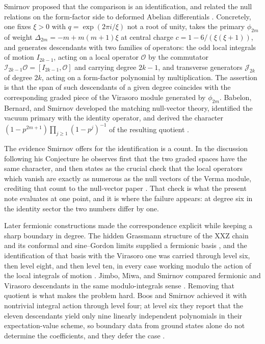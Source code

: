 \documentclass[11pt,reqno]{amsart}
\theoremstyle{plain}
\theoremstyle{definition}
\theoremstyle{remark}
\numberwithin{equation}{section}
\newcommand{\Iop}{\mathcal I}
\newcommand{\Jop}{\mathcal J}
\begin{document}
Smirnov proposed that the comparison is an identification, and related the
null relations on the form-factor side to deformed Abelian differentials
\cite{Smirnov_1996ot,Smirnov_1998so}. Concretely, one fixes $\xi>0$ with
$q=\exp(2\pi i/\xi)$ not a root of unity, takes the primary $\phi_{2m}$ of
weight $\Delta_{2m}=-m+m(m+1)\xi$ at central charge
$c=1-6/(\xi(\xi+1))$, and generates descendants with two families of
operators: the odd local integrals of motion $I_{2k-1}$, acting on a local
operator $\mathcal O$ by the commutator $\Iop_{2k-1}\mathcal O=[I_{2k-1},
\mathcal O]$ and carrying degree $2k-1$, and transverse generators
$\Jop_{2k}$ of degree $2k$, acting on a form-factor polynomial by
multiplication. The assertion is that the span of such descendants of a given
degree coincides with the corresponding graded piece of the Virasoro module
generated by $\phi_{2m}$. Babelon, Bernard, and Smirnov developed the
matching null-vector theory, identified the vacuum primary with the identity
operator, and derived the character
$(1-p^{2m+1})\prod_{j\ge1}(1-p^{j})^{-1}$ of the resulting quotient
\cite{Babelon_1997nv}.

The evidence Smirnov offers for the identification is a count. In the
discussion following his Conjecture he observes first that the two graded
spaces have the same character, and then states as the crucial check that the
local operators which vanish are exactly as numerous as the null vectors of
the Verma module, crediting that count to the null-vector paper
\cite{Smirnov_1998so,Babelon_1997nv}.
That check is what the present note evaluates at one point, and it is where
the failure appears: at degree six in the identity sector the two numbers
differ by one.

Later fermionic constructions made the correspondence explicit while keeping a
sharp boundary in degree. The hidden Grassmann structure of the XXZ chain and
its conformal and sine--Gordon limits supplied a fermionic basis
\cite{Boos_2007hg,Boos_2008hg,Jimbo_2009hg,Boos_2010hg,Jimbo_2010hg}, and the
identification of that basis with the Virasoro one was carried through level
six, then level eight, and then level ten, in every case working modulo the
action of the local integrals of motion
\cite{Boos_2010hg,Boos_2011fb,Negro_2013rr}. Jimbo, Miwa, and Smirnov compared
fermionic and Virasoro descendants in the same modulo-integrals sense
\cite{Jimbo_2011fs}. Removing that quotient is what makes the problem hard.
Boos and Smirnov achieved it with nontrivial integral action through level
four; at level six they report that the eleven descendants yield only nine
linearly independent polynomials in their expectation-value scheme, so
boundary data from ground states alone do not determine the coefficients, and
they defer the case \cite{Boos_2018nr}.
\end{document}
